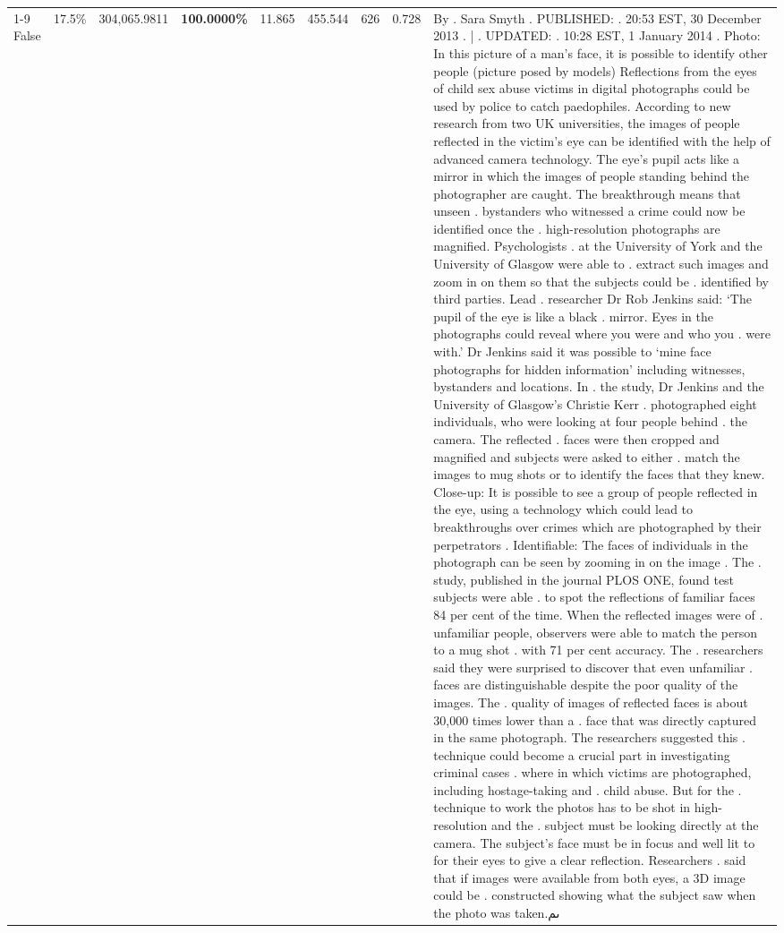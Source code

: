\begin{table}[H]
\begin{tabular}{lllrlllll}
\cline{1-9}
False & 17.5\% & \color{red} 304,065.9811 & \bfseries \color{red} 100.0000\% & 11.865 & 455.544 & 626 & 0.728 & By . Sara Smyth . PUBLISHED: . 20:53 EST, 30 December 2013 . | . UPDATED: . 10:28 EST, 1 January 2014 . Photo: In this picture of a man's face, it is possible to identify other people (picture posed by models) Reflections from the eyes of child sex abuse victims in digital photographs could be used by police to catch paedophiles. According to new research from two UK universities, the images of people reflected in the victim's eye can be identified with the help of advanced camera technology. The eye's pupil acts like a mirror in which the images of people standing behind the photographer are caught. The breakthrough means that unseen . bystanders who witnessed a crime could now be identified once the . high-resolution photographs are magnified. Psychologists . at the University of York and the University of Glasgow were able to . extract such images and zoom in on them so that the subjects could be . identified by third parties. Lead . researcher Dr Rob Jenkins said: ‘The pupil of the eye is like a black . mirror. Eyes in the photographs could reveal where you were and who you . were with.' Dr Jenkins said it was possible to ‘mine face photographs for hidden information' including witnesses, bystanders and locations. In . the study, Dr Jenkins and the University of Glasgow's Christie Kerr . photographed eight individuals, who were looking at four people behind . the camera. The reflected . faces were then cropped and magnified and subjects were asked to either . match the images to mug shots or to identify the faces that they knew. Close-up: It is possible to see a group of people reflected in the eye, using a technology which could lead to breakthroughs over crimes which are photographed by their perpetrators . Identifiable: The faces of individuals in the photograph can be seen by zooming in on the image . The . study, published in the journal PLOS ONE, found test subjects were able . to spot the reflections of familiar faces 84 per cent of the time. When the reflected images were of . unfamiliar people, observers were able to match the person to a mug shot . with 71 per cent accuracy. The . researchers said they were surprised to discover that even unfamiliar . faces are distinguishable despite the poor quality of the images. The . quality of images of reflected faces is about 30,000 times lower than a . face that was directly captured in the same photograph. The researchers suggested this . technique could become a crucial part in investigating criminal cases . where in which victims are photographed, including hostage-taking and . child abuse. But for the . technique to work the photos has to be shot in high-resolution and the . subject must be looking directly at the camera. The subject's face must be in focus and well lit to for their eyes to give a clear reflection. Researchers . said that if images were available from both eyes, a 3D image could be . constructed showing what the subject saw when the photo was taken.ىم \\

\end{tabular}
\end{table}
